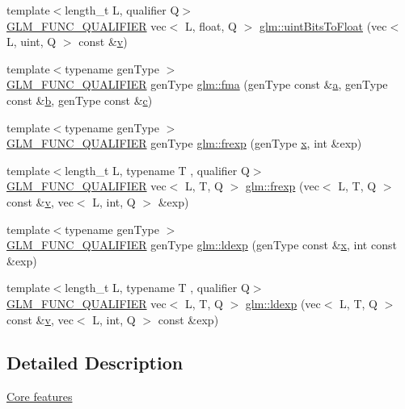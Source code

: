 \begin{DoxyCompactItemize}
\item 
{\footnotesize template$<$length\+\_\+t L, qualifier Q$>$ }\\\hyperlink{setup_8hpp_a33fdea6f91c5f834105f7415e2a64407}{G\+L\+M\+\_\+\+F\+U\+N\+C\+\_\+\+Q\+U\+A\+L\+I\+F\+I\+ER} vec$<$ L, float, Q $>$ \hyperlink{group__core__func__common_ga97f46b5f7b42fe44482e13356eb394ae}{glm\+::uint\+Bits\+To\+Float} (vec$<$ L, uint, Q $>$ const \&\hyperlink{_s_d_l__opengl_8h_a10a82eabcb59d2fcd74acee063775f90}{v})
\item 
{\footnotesize template$<$typename gen\+Type $>$ }\\\hyperlink{setup_8hpp_a33fdea6f91c5f834105f7415e2a64407}{G\+L\+M\+\_\+\+F\+U\+N\+C\+\_\+\+Q\+U\+A\+L\+I\+F\+I\+ER} gen\+Type \hyperlink{group__core__func__common_gad0f444d4b81cc53c3b6edf5aa25078c2}{glm\+::fma} (gen\+Type const \&\hyperlink{_s_d_l__opengl__glext_8h_a3309789fc188587d666cda5ece79cf82}{a}, gen\+Type const \&\hyperlink{_s_d_l__opengl__glext_8h_a0f71581a41fd2264c8944126dabbd010}{b}, gen\+Type const \&\hyperlink{_s_d_l__opengl__glext_8h_a1f2d7f8147412c43ba2303a56f97ee73}{c})
\item 
{\footnotesize template$<$typename gen\+Type $>$ }\\\hyperlink{setup_8hpp_a33fdea6f91c5f834105f7415e2a64407}{G\+L\+M\+\_\+\+F\+U\+N\+C\+\_\+\+Q\+U\+A\+L\+I\+F\+I\+ER} gen\+Type \hyperlink{namespaceglm_a90f422cea9e6e5c383bb69b593434c97}{glm\+::frexp} (gen\+Type \hyperlink{_s_d_l__opengl_8h_ad0e63d0edcdbd3d79554076bf309fd47}{x}, int \&exp)
\item 
{\footnotesize template$<$length\+\_\+t L, typename T , qualifier Q$>$ }\\\hyperlink{setup_8hpp_a33fdea6f91c5f834105f7415e2a64407}{G\+L\+M\+\_\+\+F\+U\+N\+C\+\_\+\+Q\+U\+A\+L\+I\+F\+I\+ER} vec$<$ L, T, Q $>$ \hyperlink{namespaceglm_a1dcaee68d7c967da4d9a5a31768934cf}{glm\+::frexp} (vec$<$ L, T, Q $>$ const \&\hyperlink{_s_d_l__opengl_8h_a10a82eabcb59d2fcd74acee063775f90}{v}, vec$<$ L, int, Q $>$ \&exp)
\item 
{\footnotesize template$<$typename gen\+Type $>$ }\\\hyperlink{setup_8hpp_a33fdea6f91c5f834105f7415e2a64407}{G\+L\+M\+\_\+\+F\+U\+N\+C\+\_\+\+Q\+U\+A\+L\+I\+F\+I\+ER} gen\+Type \hyperlink{namespaceglm_a2632eefd82cbdf3ca860c41579a5ef9e}{glm\+::ldexp} (gen\+Type const \&\hyperlink{_s_d_l__opengl_8h_ad0e63d0edcdbd3d79554076bf309fd47}{x}, int const \&exp)
\item 
{\footnotesize template$<$length\+\_\+t L, typename T , qualifier Q$>$ }\\\hyperlink{setup_8hpp_a33fdea6f91c5f834105f7415e2a64407}{G\+L\+M\+\_\+\+F\+U\+N\+C\+\_\+\+Q\+U\+A\+L\+I\+F\+I\+ER} vec$<$ L, T, Q $>$ \hyperlink{namespaceglm_ae65a4386c739936ac636e56cfdb9dc19}{glm\+::ldexp} (vec$<$ L, T, Q $>$ const \&\hyperlink{_s_d_l__opengl_8h_a10a82eabcb59d2fcd74acee063775f90}{v}, vec$<$ L, int, Q $>$ const \&exp)
\end{DoxyCompactItemize}


\subsection{Detailed Description}
\hyperlink{group__core}{Core features} 